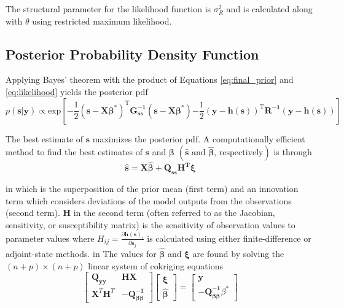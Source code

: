 \documentclass[11pt,oneside,onecolumn]{usgsreport}
\begin{document}
\begin{appendix}
The structural parameter for the likelihood function is $\sigma_{R}^{2}$
and is calculated along with $\theta$ using restricted maximum likelihood.


\subsection{Posterior Probability Density Function}

Applying Bayes' theorem with the product of Equations \ref{eq:final_prior}
and \ref{eq:likelihood} yields the posterior pdf
\begin{equation}
p(\mathbf{s|y})\propto\mathrm{exp\left[\mathbf{-}\frac{1}{2}(\mathbf{s-X\beta}^{*})^{T}\mathbf{G_{\mathbf{ss}}^{-1}}(\mathbf{s-X\beta^{*}})\mathbf{-}\frac{1}{2}\left(\mathbf{y-h}(\mathbf{s})\right)^{T}\mathbf{R^{-1}\left(\mathbf{y-h}(\mathbf{s})\right)}\right]}\label{eq:posterior}
\end{equation}


The best estimate of $\mathbf{s}$ maximizes the posterior pdf. A
computationally efficient method to find the best estimates of $\mathbf{s}$
and $\mathbf{\beta}$ $\left(\hat{\mathbf{s}}\mbox{ and }\mathbf{\hat{\beta}}\mbox{, respectively}\right)$
is through
\begin{equation}
\hat{\mathbf{s}}=\mathbf{X\hat{\beta}+Q_{ss}H^{\mathbf{T}}\xi}\label{eq:shat}
\end{equation}

 in
which is the superposition of the prior mean (first term) and an innovation
term which considers deviations of the model outputs from the observations
(second term). $\mathbf{H}$ in the second term (often referred to
as the Jacobian, sensitivity, or susceptibility matrix) is the sensitivity
of observation values to parameter values $\mbox{where }H_{ij}=\frac{\partial\mathbf{h}\left(\mathbf{s}\right)_{i}}{\partial\mathbf{s}_{j}}$
is calculated using either finite-difference or adjoint-state methods.
 in
The values for $\mathbf{\hat{\beta}}$ and $\mathbf{\xi}$ are found
by solving the $(n+p)\times(n+p)$ linear system of cokriging equations
\begin{equation}
\left[\begin{array}{cc}
\mathbf{Q_{yy}} & \mathbf{HX}\\
\mathbf{X}^{T}\mathbf{H}^{T} & \mathbf{-}\mathbf{Q_{\beta\beta}^{-1}}
\end{array}\right]\left[\begin{array}{c}
\mathbf{\xi}\\
\mathbf{\hat{\beta}}
\end{array}\right]=\left[\begin{array}{c}
\mathbf{y}\\
\mathbf{-}\mathbf{Q_{\beta\beta}^{-1}}\beta^{*}
\end{array}\right]\label{eq:cokriging}
\end{equation}


\end{appendix}
\end{document}

